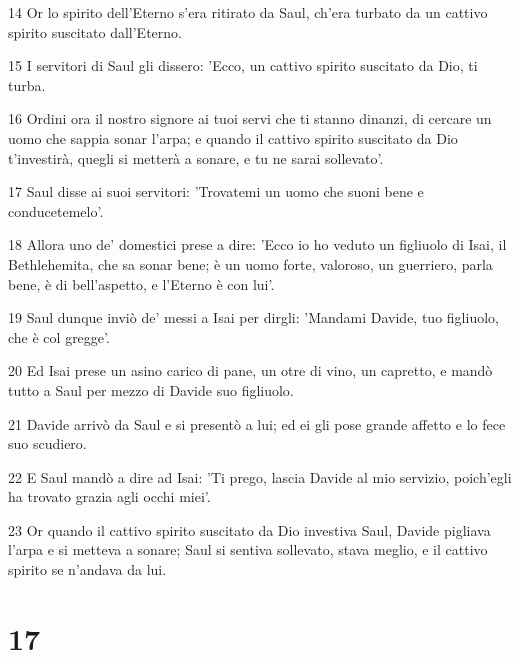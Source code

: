 \par 14 Or lo spirito dell'Eterno s'era ritirato da Saul, ch'era turbato da un cattivo spirito suscitato dall'Eterno.
\par 15 I servitori di Saul gli dissero: 'Ecco, un cattivo spirito suscitato da Dio, ti turba.
\par 16 Ordini ora il nostro signore ai tuoi servi che ti stanno dinanzi, di cercare un uomo che sappia sonar l'arpa; e quando il cattivo spirito suscitato da Dio t'investirà, quegli si metterà a sonare, e tu ne sarai sollevato'.
\par 17 Saul disse ai suoi servitori: 'Trovatemi un uomo che suoni bene e conducetemelo'.
\par 18 Allora uno de' domestici prese a dire: 'Ecco io ho veduto un figliuolo di Isai, il Bethlehemita, che sa sonar bene; è un uomo forte, valoroso, un guerriero, parla bene, è di bell'aspetto, e l'Eterno è con lui'.
\par 19 Saul dunque inviò de' messi a Isai per dirgli: 'Mandami Davide, tuo figliuolo, che è col gregge'.
\par 20 Ed Isai prese un asino carico di pane, un otre di vino, un capretto, e mandò tutto a Saul per mezzo di Davide suo figliuolo.
\par 21 Davide arrivò da Saul e si presentò a lui; ed ei gli pose grande affetto e lo fece suo scudiero.
\par 22 E Saul mandò a dire ad Isai: 'Ti prego, lascia Davide al mio servizio, poich'egli ha trovato grazia agli occhi miei'.
\par 23 Or quando il cattivo spirito suscitato da Dio investiva Saul, Davide pigliava l'arpa e si metteva a sonare; Saul si sentiva sollevato, stava meglio, e il cattivo spirito se n'andava da lui.

\chapter{17}

